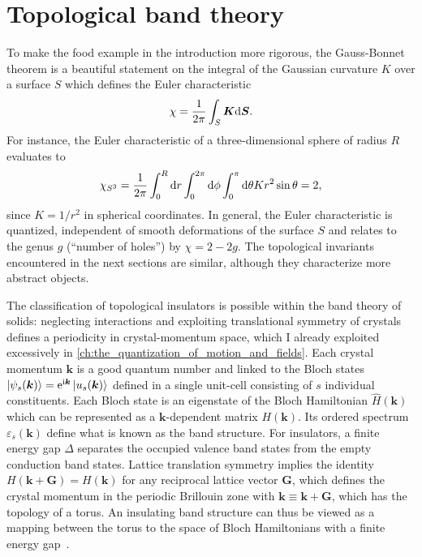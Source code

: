 \section{Topological band theory}
\label{sec:topological_band_theory}
%
%
To make the food example in the introduction more rigorous, the Gauss-Bonnet theorem is a beautiful statement on the integral of the Gaussian curvature $K$ over a surface $S$ which defines the Euler characteristic~\cite{Nakahara1990}
\begin{align}
    \chi = \frac1{2\pi}\int_S {\bm K}\mathrm d {\bm S}.
    \label{eq:gauss_bonnet_theorem}
\end{align}
For instance, the Euler characteristic of a three-dimensional sphere of radius $R$ evaluates to
\begin{align}
    \chi_{S^3} = \frac1{2\pi}\int_0^R\mathrm d r\int_0^{2\pi}\mathrm d\phi \int_0^\pi\mathrm d\theta K r^2\sin\theta = 2,
\end{align}
since $K=1/r^2$ in spherical coordinates.
In general, the Euler characteristic is quantized, independent of smooth deformations of the surface $S$ and relates to the genus $g$ (``number of holes'') by $\chi=2-2g$.
The topological invariants encountered in the next sections are similar, although they characterize more abstract objects.

The classification of topological insulators is possible within the band theory of solids: neglecting interactions and exploiting translational symmetry of crystals defines a periodicity in crystal-momentum space, which I already exploited excessively in \cref{ch:the_quantization_of_motion_and_fields}.
Each crystal momentum ${\bm k}$ is a good quantum number and linked to the Bloch states $\ket{\psi_s(\bm k)}=\mathrm e^{\mathrm i\bm k}\ket{u_s(\bm k)}$ defined in a single unit-cell consisting of $s$ individual constituents.
Each Bloch state is an eigenstate of the Bloch Hamiltonian $\hat H(\bm k)$ which can be represented as a $\bm k$-dependent matrix $H(\bm k)$.
Its ordered spectrum $\varepsilon_s(\bm k)$ define what is known as the band structure.
For insulators, a finite energy gap $\Delta$ separates the occupied valence band states from the empty conduction band states.
Lattice translation symmetry implies the identity $H(\bm k + \bm G) = H(\bm k)$ for any reciprocal lattice vector $\bm G$, which defines the crystal momentum in the periodic Brillouin zone with $\bm k\equiv \bm k+\bm G$, which has the topology of a torus.
An insulating band structure can thus be viewed as a mapping between the torus to the space of Bloch Hamiltonians with a finite energy gap~\cite{Kane2013}.

